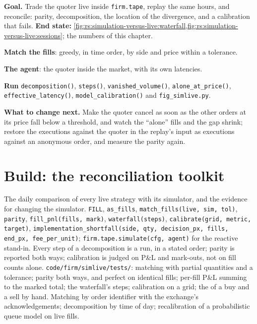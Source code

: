 \begin{tutorial}
\textbf{Goal.} Trade the quoter live inside \texttt{firm.tape}, replay the same hours, and reconcile: parity, decomposition, the location of the divergence, and a
calibration that fails. \textbf{End state:} \cref{fig:rs:simulation-versus-live:waterfall,fig:rs:simulation-versus-live:sessions}; the numbers of this chapter.
\begin{tutsteps}
\item \textbf{Match the fills}: greedy, in time order, by side and price within a tolerance.
\label{lst:rs:simulation-versus-live:match}
\item \textbf{The agent}: the quoter inside the market, with its own latencies.
\label{lst:rs:simulation-versus-live:agent}
\item \textbf{Run} \texttt{decomposition()}, \texttt{steps()}, \texttt{vanished\_volume()}, \texttt{alone\_at\_price()}, \texttt{effective\_latency()},
\texttt{model\_calibration()} and \texttt{fig\_simlive.py}.
\end{tutsteps}
\textbf{What to change next.} Make the quoter cancel as soon as the other orders at its price fall below a threshold, and watch the ``alone'' fills and the gap shrink;
restore the executions against the quoter in the replay's input as executions against an anonymous order, and measure the parity again.
\end{tutorial}

\section{Build: the reconciliation toolkit}\label{bld:rs:simulation-versus-live:simlive}

\begin{build}
 The daily comparison of every live strategy with its simulator, and the evidence for changing the simulator.
 \texttt{FILL}, \texttt{as\_fills}, \texttt{match\_fills(live, sim, tol)}, \texttt{parity}, \texttt{fill\_pnl(fills, mark)}, \texttt{waterfall(steps)},
\texttt{calibrate(grid, metric, target)}, \texttt{implementation\_shortfall(side, qty, decision\_px, fills, end\_px, fee\_per\_unit)}; \texttt{firm.tape.simulate(cfg,
agent)} for the reactive stand-in.
 Every step of a decomposition is a run, in a stated order; parity is reported both ways; calibration is judged on P\&L and mark-outs, not on fill counts alone.
 \texttt{code/firm/simlive/tests/}: matching with partial quantities and a tolerance; parity both ways, and perfect on identical fills; per-fill P\&L
summing to the marked total; the waterfall's steps; calibration on a grid; the  of a buy and a sell by hand.
 Matching by order identifier with the exchange's acknowledgements; decomposition by time of day; recalibration of a probabilistic queue model on live fills.
\end{build}

